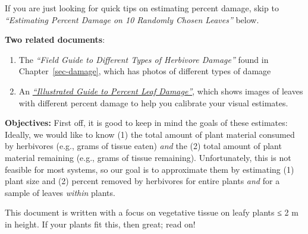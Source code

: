 \documentclass[
  letterpaper,
  oneside,
  open=any]{scrbook}
\begin{document}
\begin{tcolorbox}[enhanced jigsaw, rightrule=.15mm, title=\textcolor{quarto-callout-note-color}{\faInfo}\hspace{0.5em}{Note}, colbacktitle=quarto-callout-note-color!10!white, coltitle=black, bottomtitle=1mm, breakable, colback=white, leftrule=.75mm, arc=.35mm, toprule=.15mm, colframe=quarto-callout-note-color-frame, opacityback=0, left=2mm, toptitle=1mm, titlerule=0mm, bottomrule=.15mm, opacitybacktitle=0.6]

If you are just looking for quick tips on estimating percent damage,
skip to \emph{``Estimating Percent Damage on 10 Randomly Chosen
Leaves''} below.

\end{tcolorbox}

\textbf{Two related documents}:

\begin{enumerate}
\def\labelenumi{\arabic{enumi}.}
\item
  The \emph{``Field Guide to Different Types of Herbivore Damage''}
  found in Chapter~\ref{sec-damage}, which has photos of different types
  of damage
\item
  An
  \href{./protocols/Illustrated\%20Guide\%20to\%20Percent\%20Leaf\%20Damage.pdf}{\emph{``Illustrated
  Guide to Percent Leaf Damage''}}, which shows images of leaves with
  different percent damage to help you calibrate your visual estimates.
\end{enumerate}

\textbf{Objectives:} First off, it is good to keep in mind the goals of
these estimates: Ideally, we would like to know (1) the total amount of
plant material consumed by herbivores (e.g., grams of tissue eaten)
\emph{and} the (2) total amount of plant material remaining (e.g., grams
of tissue remaining). Unfortunately, this is not feasible for most
systems, so our goal is to approximate them by estimating (1) plant size
and (2) percent removed by herbivores for entire plants \emph{and} for a
sample of leaves \emph{within} plants.

\begin{tcolorbox}[enhanced jigsaw, rightrule=.15mm, title=\textcolor{quarto-callout-tip-color}{\faLightbulb}\hspace{0.5em}{What kinds of plants will this work for?}, colbacktitle=quarto-callout-tip-color!10!white, coltitle=black, bottomtitle=1mm, breakable, colback=white, leftrule=.75mm, arc=.35mm, toprule=.15mm, colframe=quarto-callout-tip-color-frame, opacityback=0, left=2mm, toptitle=1mm, titlerule=0mm, bottomrule=.15mm, opacitybacktitle=0.6]

This document is written with a focus on vegetative tissue on leafy
plants ≤ 2 m in height. If your plants fit this, then great; read on!

\end{tcolorbox}
\end{document}
